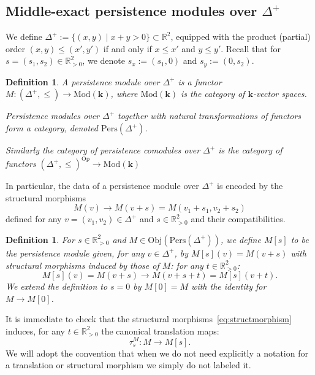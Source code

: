 \documentclass[a4paper, english, 11pt]{article}
\newcommand{\kk}[0]{\textbf{k}}
\newcommand{\Mod}[0]{\text{Mod}}
\newcommand{\0}{\vec{0}}
\newcommand{\R}[0]{\mathbb{R}}
\newcommand{\Obj}[0]{\text{Obj}}
\newcommand{\Op}[0]{\text{Op}}
\newcommand{\Pers}[0]{\text{Pers}}
\newtheorem{defi}[prop]{Definition}
\begin{document}
\subsection{Middle-exact persistence modules over $\Delta^+$}

We define $\Delta^+ := \{(x,y)\mid x+y > 0\}\subset \R^2$, equipped with the product (partial) order $(x,y)\leq (x',y')$ if and only if $x\leq x'$ and $y\leq y' $. Recall that for $s=(s_1,s_2)\in \R^2_{>0}$, we denote $s_x:=(s_1,0)$ and $s_y := (0,s_2)$. 

\begin{defi}\label{D:PerModule}
A persistence module over $\Delta^+$ is a functor $M : (\Delta^+,\leq) \longrightarrow \Mod(\kk)$, where $\Mod(\kk)$ is the category of $\kk$-vector spaces.

Persistence modules over $\Delta^+$ together with natural transformations of functors form a category, denoted $\Pers(\Delta^+)$.

Similarly the category of persistence comodules over $\Delta^+$ is the category of functors $(\Delta^+,\leq)^{\Op} \longrightarrow \Mod(\kk)$
\end{defi}
In particular, the data of a  persistence module over $\Delta^+$ is encoded by the  structural  morphisms  
\begin{equation}\label{eq:structmorphism}
    M(v) \longrightarrow M(v+s)= M(v_1+s_1, v_2+s_2)
\end{equation}
defined for any $v=(v_1,v_2)\in \Delta^+$ and $s\in \R^2_{>0}$ and their compatibilities. 

\begin{defi} For $s\in \R^2_{>0}$ and $M\in \Obj( \Pers(\Delta^+))$, we define 
$M[s]$ to be the persistence module given, for any $v\in \Delta^+$, by $M[s](v)= M(v+s)$ with structural morphisms induced by those of $M$: for any $t\in \R^2_{>0}$:
$$ M[s](v)=M(v+s) \longrightarrow M(v+s+t)=M[s](v+t).$$
We extend the definition to $s=0$ by $M[0]=M$ with the identity for  $M\to M[0]$.
\end{defi}
It is immediate to check that the structural morphisms~\eqref{eq:structmorphism}
induces, for any $t\in \R^2_{>0}$ the canonical translation maps:
\begin{equation}\label{eq:translmorphism}
   \tau_{s}^M: M \longrightarrow M[s].
\end{equation}
We will adopt the convention that when we do not need explicitly a notation for a translation or structural morphism we simply do not labeled it. 
\end{document}

